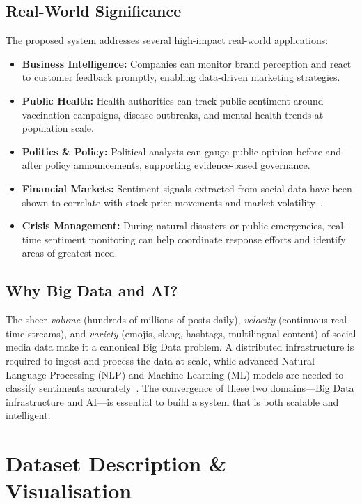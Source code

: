 \documentclass[conference]{IEEEtran}
\begin{document}
\subsection{Real-World Significance}
The proposed system addresses several high-impact real-world applications:
\begin{itemize}[leftmargin=*]
    \item \textbf{Business Intelligence:} Companies can monitor brand perception and react to customer feedback promptly, enabling data-driven marketing strategies.
    \item \textbf{Public Health:} Health authorities can track public sentiment around vaccination campaigns, disease outbreaks, and mental health trends at population scale.
    \item \textbf{Politics \& Policy:} Political analysts can gauge public opinion before and after policy announcements, supporting evidence-based governance.
    \item \textbf{Financial Markets:} Sentiment signals extracted from social data have been shown to correlate with stock price movements and market volatility~\cite{kreps2011kafka}.
    \item \textbf{Crisis Management:} During natural disasters or public emergencies, real-time sentiment monitoring can help coordinate response efforts and identify areas of greatest need.
\end{itemize}

\subsection{Why Big Data and AI?}
The sheer \textit{volume} (hundreds of millions of posts daily), \textit{velocity} (continuous real-time streams), and \textit{variety} (emojis, slang, hashtags, multilingual content) of social media data make it a canonical Big Data problem. A distributed infrastructure is required to ingest and process the data at scale, while advanced Natural Language Processing (NLP) and Machine Learning (ML) models are needed to classify sentiments accurately~\cite{devlin2019bert}. The convergence of these two domains---Big Data infrastructure and AI---is essential to build a system that is both scalable and intelligent.

\section{Dataset Description \& Visualisation}
\end{document}
